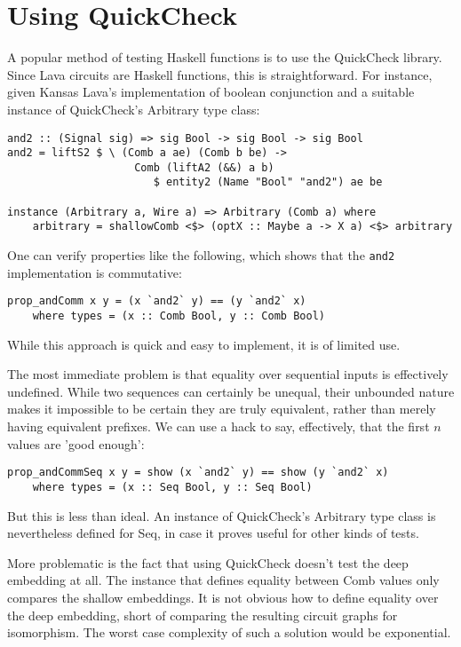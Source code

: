 \documentclass{llncs}
\begin{document}
\section{Using QuickCheck}
\label{sec:quickcheck}

A popular method of testing Haskell functions is to use the QuickCheck library.
Since Lava circuits are Haskell functions, this is straightforward.
For instance, given Kansas Lava's implementation of boolean conjunction and
a suitable instance of QuickCheck's Arbitrary type class:

\begin{verbatim}
and2 :: (Signal sig) => sig Bool -> sig Bool -> sig Bool
and2 = liftS2 $ \ (Comb a ae) (Comb b be) ->
                    Comb (liftA2 (&&) a b)
                       $ entity2 (Name "Bool" "and2") ae be

instance (Arbitrary a, Wire a) => Arbitrary (Comb a) where
    arbitrary = shallowComb <$> (optX :: Maybe a -> X a) <$> arbitrary
\end{verbatim}

One can verify properties like the following, which shows that the
\verb|and2| implementation is commutative:

\begin{verbatim}
prop_andComm x y = (x `and2` y) == (y `and2` x)
    where types = (x :: Comb Bool, y :: Comb Bool)
\end{verbatim}

While this approach is quick and easy to implement, it is of
limited use.

The most immediate problem is that equality over sequential
inputs is effectively undefined. While two sequences can certainly
be unequal, their unbounded nature makes it impossible to be
certain they are truly equivalent, rather than merely having
equivalent prefixes. We can use a hack to say, effectively, that
the first $n$ values are 'good enough':

\begin{verbatim}
prop_andCommSeq x y = show (x `and2` y) == show (y `and2` x)
    where types = (x :: Seq Bool, y :: Seq Bool)
\end{verbatim}

But this is less than ideal. An instance of QuickCheck's Arbitrary
type class is nevertheless defined for Seq, in case it proves
useful for other kinds of tests.

More problematic is the fact that using QuickCheck doesn't test the deep
embedding at all. The instance that defines equality between
Comb values only compares the shallow embeddings. It is
not obvious how to define equality over the deep embedding,
short of comparing the resulting circuit graphs for isomorphism.
The worst case complexity of such a solution would be exponential.
\end{document}
